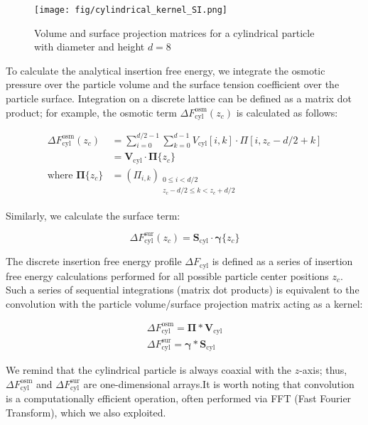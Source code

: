 \documentclass[10pt, a4paper]{article}
\begin{document}
\begin{multicols}{2}
\begin{figure}[H]
    \centering
    \texttt{[image: fig/cylindrical\_kernel\_SI.png]}
    \caption{Volume and surface projection matrices for a cylindrical particle with diameter and height $d = 8$}
    \label{fig:cylindrical_kernel_SI}
\end{figure}

To calculate the analytical insertion free energy, we integrate the osmotic pressure over the particle volume and the surface tension coefficient over the particle surface.
Integration on a discrete lattice can be defined as a matrix dot product; for example, the osmotic term $\Delta F_{\text{cyl}}^{\text{osm}}(z_c)$ is calculated as follows:

\begin{equation}\label{eq:cyl_fe_osm}
    \begin{split}
        \Delta F_{\text{cyl}}^{\text{osm}}(z_c) &= \sum_{i=0}^{d/2 - 1} \sum_{k=0}^{d - 1} V_{\text{cyl}}[i, k] \cdot \Pi[i, z_c - d/2 + k] \\
        &= \mathbf{V}_{\text{cyl}} \cdot \boldsymbol{\Pi}\{z_c\} \\
        \text{where } \boldsymbol{\Pi}\{z_c\} &= \left( \Pi_{i, k} \right)_{\substack{0 \leq i < d/2 \\ z_c - d/2 \leq k < z_c + d/2}}
    \end{split}
\end{equation}

Similarly, we calculate the surface term:

\begin{equation}\label{eq:cyl_fe_sur}
    \Delta F_{\text{cyl}}^{\text{sur}}(z_c) = \mathbf{S}_{\text{cyl}} \cdot \boldsymbol{\gamma}\{z_c\}
\end{equation}

The discrete insertion free energy profile $\Delta F_{\text{cyl}}$ is defined as a series of insertion free energy calculations performed for all possible particle center positions $z_c$.
Such a series of sequential integrations (matrix dot products) is equivalent to the convolution with the particle volume/surface projection matrix acting as a kernel:

\begin{eqnarray}
    \Delta F_{\text{cyl}}^{\text{osm}} = \boldsymbol{\Pi} \ast \mathbf{V}_{\text{cyl}} \\
    \Delta F_{\text{cyl}}^{\text{sur}} = \boldsymbol{\gamma} \ast \mathbf{S}_{\text{cyl}}
\end{eqnarray}

We remind that the cylindrical particle is always coaxial with the $z$-axis; thus, $\Delta F_{\text{cyl}}^{\text{osm}}$ and $\Delta F_{\text{cyl}}^{\text{sur}}$ are one-dimensional arrays.It is worth noting that convolution is a computationally efficient operation, often performed via FFT (Fast Fourier Transform), which we also exploited.

\end{multicols}
\end{document}
